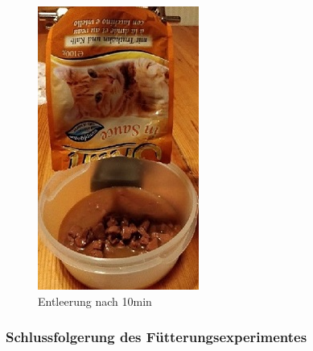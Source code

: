 \begin{figure}[H]
\begin{minipage}[hbt]{.33 \linewidth}
     \includegraphics[width=\linewidth]{Bilder/Fuetterungsexperiment/Fuetterungs_Ende}  
      \caption{Entleerung nach 10min}
     \label{Fütterungs_Ende}
   \end{minipage}
\end{figure}
\newpage
\subsubsection{Schlussfolgerung des Fütterungsexperimentes}

